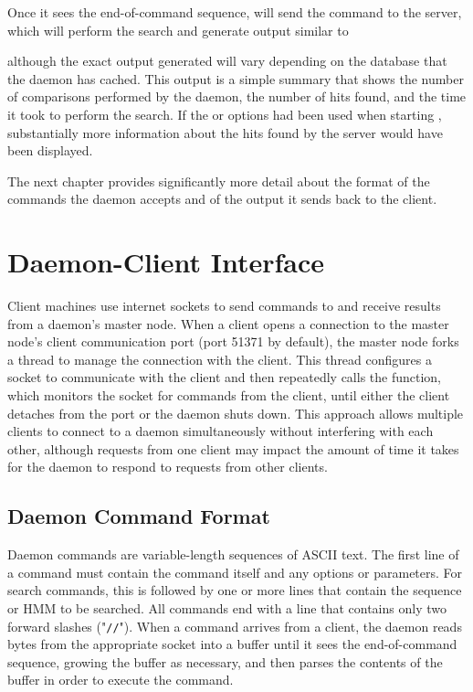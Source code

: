 \documentclass[notoc,justified]{tufte-book}    %
\begin{document}
{Once it sees the end-of-command sequence,  will send the command to the server, which will perform the search and generate output similar to

\vspace{-1ex}
 \vspace{-1ex}

 although the exact output generated will vary depending on the database that the daemon has cached.  This output is a simple summary that shows the number of comparisons performed by the daemon, the number of hits found, and the time it took to perform the search.  If the  or  options had been used when starting , substantially more information about the hits found by the server would have been displayed.

 The next chapter provides significantly more detail about the format of the commands the daemon accepts and of the output it sends back to the client.

\chapter{Daemon-Client Interface}
Client machines use internet sockets to send commands to and receive results from a daemon's master node.  When a client opens a connection to the master node's client communication port (port 51371 by default), the master node forks a thread to manage the connection with the client.  This thread configures a socket to communicate with the client and then repeatedly calls the  function, which monitors the socket for commands from the client, until either the client detaches from the port or the daemon shuts down.  This approach allows multiple clients to connect to a daemon simultaneously without interfering with each other, although requests from one client may impact the amount of time it takes for the daemon to respond to requests from other clients.


\section{Daemon Command Format}
Daemon commands are variable-length sequences of ASCII text.  The first line of a command must contain the command itself and any options or parameters.  For search commands, this is followed by one or more lines that contain the sequence or HMM to be searched.  All commands end with a line that contains only two forward slashes ("{\tt //}").  When a command arrives from a client, the daemon reads bytes from the appropriate socket into a buffer until it sees the end-of-command sequence, growing the buffer as necessary, and then parses the contents of the buffer in order to execute the command.   

}
\end{document}
